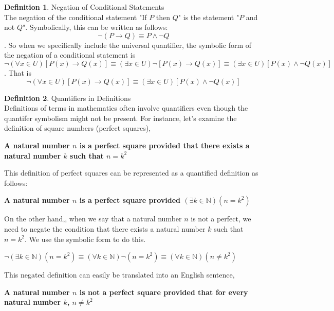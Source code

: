\documentclass{book}
\theoremstyle{definition}
\newtheorem{definition}{Definition}[section]
\theoremstyle{remark}
\newcommand{\bb}[1]{\mathbb{#1}}
\begin{document}
\begin{definition}
Negation of Conditional Statements \\

The negation of the conditional statement "If $P$ then $Q$" is the statement "$P$ and not $Q$". Symbolically, this can be written as follows: \[ \neg (P \to Q) \equiv P \wedge \neg Q \]. So when we specifically include the universal quantifier, the symbolic form of the negation of a conditional statement is \[ \neg(\forall x \in U)[P(x) \to Q(x)] \equiv (\exists x \in U)\neg[P(x) \to Q(x)] \equiv (\exists x \in U)[P(x) \wedge \neg Q(x)] \]. That is \[ \neg(\forall x \in U)[P(x) \to Q(x)] \equiv (\exists x \in U)[P(x) \wedge \neg Q(x)] \]
\end{definition}


\begin{definition}
Quantifiers in Definitions \\

Definitions of terms in mathematics often involve quantifiers even though the quantifer symbolism might not be present. For instance, let's examine the definition of square numbers (perfect squares), 
	\begin{center}
	\bf A natural number $n$ is a perfect square provided that there exists a natural number $k$ such that $n = k^2$
	\end{center}
This definition of perfect squares can be represented as a quantified definition as follows:
	\begin{center}
	\bf A natural number $n$ is a perfect square provided $(\exists k \in \bb{N})(n = k^2)$
	\end{center}
On the other hand,, when we say that a natural number $n$ is not a perfect, we need to negate the condition that there exists a natural number $k$ such that $n = k^2$. We use the symbolic form to do this. 
	\begin{center}
	$\neg(\exists k \in \bb{N})(n = k^2) \equiv (\forall k \in \bb{N})\neg(n = k^2) \equiv (\forall k \in \bb{N})(n \neq k^2)$
	\end{center}
This negated definition can easily be translated into an English sentence, 
	\begin{center}
	\bf A natural number $n$ is not a perfect square provided that for every natural number $k$, $n \neq k^2$
	\end{center}
\end{definition}
\end{document}
